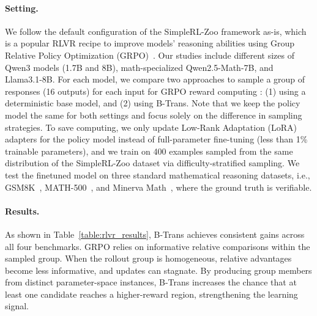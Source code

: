 \documentclass[11pt]{article}
\begin{document}
\paragraph{Setting.} 
We follow the default configuration of the SimpleRL-Zoo framework as-is, which is a popular RLVR recipe to improve models' reasoning abilities using Group Relative Policy Optimization (GRPO)~\cite{guo2025deepseek}. Our studies include different sizes of Qwen3 models (1.7B and 8B), math-specialized Qwen2.5-Math-7B, and Llama3.1-8B. 
For each model, we compare two approaches to sample a group of responses (16 outputs) for each input for GRPO reward computing : (1) using a deterministic base model, and (2) using B-Trans. Note that we keep the policy model the same for both settings and focus solely on the difference in sampling strategies.
To save computing, we only update Low-Rank Adaptation (LoRA)~\cite{hu2022lora} adapters for the policy model instead of full-parameter fine-tuning (less than 1\% trainable parameters), and we train on 400 examples sampled from the same distribution of the SimpleRL-Zoo dataset via difficulty-stratified sampling.
We test the finetuned model on three standard mathematical reasoning datasets, i.e., GSM8K~\cite{lewkowycz2022solving}, MATH-500~\cite{lightman2023lets}, and Minerva Math~\cite{lewkowycz2022solving}, where the ground truth is verifiable. 


\paragraph{Results.} 
As shown in Table~\ref{table:rlvr_results}, B-Trans achieves consistent gains across all four benchmarks.
GRPO relies on informative relative comparisons within the sampled group. When the rollout group is homogeneous, relative advantages become less informative, and updates can stagnate. 
By producing group members from distinct parameter-space instances, B-Trans increases the chance that at least one candidate reaches a higher-reward region, strengthening the learning signal. 
\end{document}
